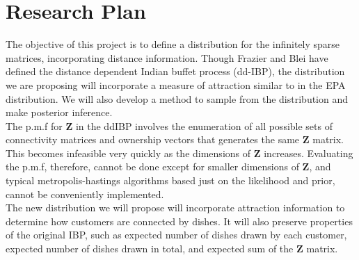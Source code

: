 \chapter{Research Plan}%

The objective of this project is to define a distribution for the infinitely
sparse matrices, incorporating distance information. Though Frazier and Blei
have defined the distance dependent Indian buffet process (dd-IBP), the 
distribution we are proposing will incorporate a measure of attraction similar
to in the EPA distribution. We will also develop a method to sample from the
distribution and make posterior inference. \\

\noindent
The p.m.f for $\bm Z$ in the ddIBP involves the enumeration of all possible sets
of connectivity matrices and ownership vectors that generates the same $\bm Z$ 
matrix. This becomes infeasible very quickly as the dimensions of $\bm Z$ 
increases. Evaluating the p.m.f, therefore, cannot be done except for smaller
dimensions of $\bm Z$, and typical metropolis-hastings algorithms based just on 
the likelihood and prior, cannot be conveniently implemented.\\

\noindent
The new distribution we will propose will incorporate attraction information to
determine how customers are connected by dishes. It will also preserve properties 
of the original IBP, such as expected number of dishes drawn by each customer,
expected number of dishes drawn in total, and expected sum of the $\bm Z$ matrix.



